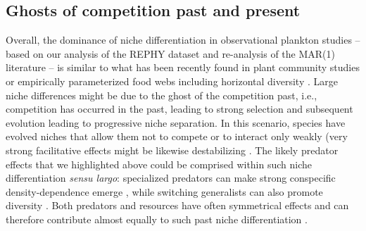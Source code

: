 \documentclass[10pt]{article}
\begin{document}
\subsection*{Ghosts of competition past and present}

Overall, the dominance of niche differentiation in observational plankton
studies -- based on our analysis of the REPHY dataset and re-analysis
of the MAR(1) literature -- is similar to what has been recently
found in plant community studies \citep{volkov_patterns_2007,adler_competition_2018}
or empirically parameterized food webs including horizontal diversity
\citep{barabas_self-regulation_2017}. Large niche differences might
be due to the ghost of the competition past, i.e., competition has
occurred in the past, leading to strong selection and subsequent evolution
leading to progressive niche separation. In this scenario, species
have evolved niches that allow them not to compete or to interact
only weakly (very strong facilitative effects might be likewise destabilizing
\citep{coyte_ecology_2015}. The likely predator effects that we highlighted
above could be comprised within such niche differentiation \emph{sensu
largo}: specialized predators can make strong conspecific density-dependence
emerge \citep{bagchi_pathogens_2014,comita_testing_2014}, while switching
generalists can also promote diversity \citep{vallina2014maximal}.
Both predators and resources have often symmetrical effects and can
therefore contribute almost equally to such past niche differentiation
\citep{chesson_updates_2018}.
\end{document}
